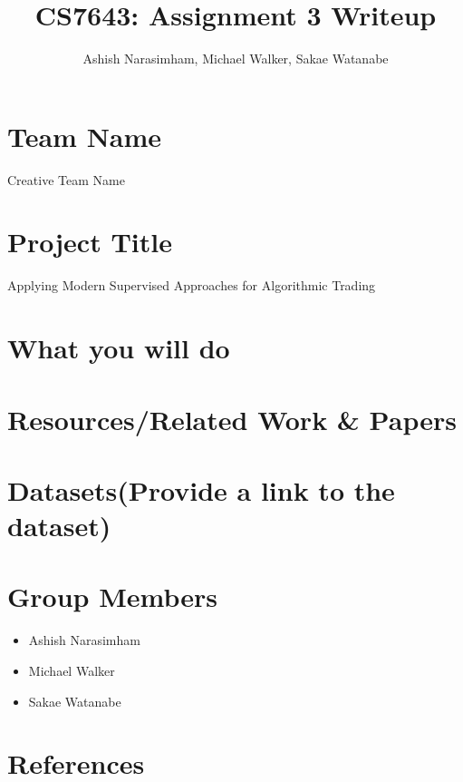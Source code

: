 \documentclass[
	letterpaper, %
]{jdf}
\author{Ashish Narasimham, Michael Walker, Sakae Watanabe}
\title{CS7643: Assignment 3 Writeup}
\begin{document}
\maketitle

\section*{Team Name}

Creative Team Name

\section*{Project Title}

Applying Modern Supervised Approaches for Algorithmic Trading

\section*{What you will do}

\section*{Resources/Related Work \& Papers}

\section*{Datasets(Provide a link to the dataset)}

\section*{Group Members}

\begin{itemize}
	\item Ashish Narasimham
	\item Michael Walker
	\item Sakae Watanabe
\end{itemize}

\section{References}

\printbibliography[heading=none]
\end{document}
